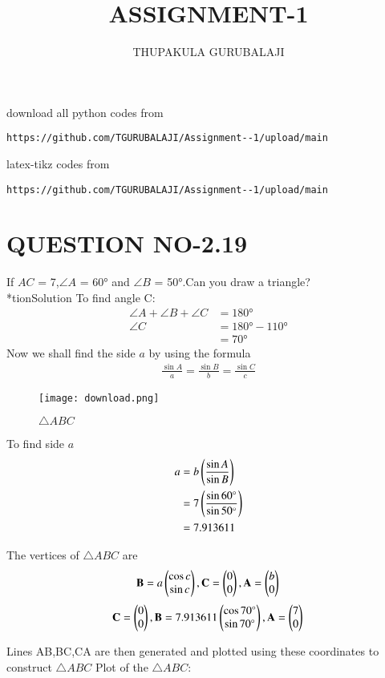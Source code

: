 \documentclass[journal,12pt,twocolumn]{IEEEtran}
\begin{document}
     \def\rightbox#1{\makebox[0in][r]{#1}}
     \def\centbox#1{\makebox[0in]{#1}}
     \def\topbox#1{\raisebox{-\baselineskip}[0in][0in]{#1}}
     \def\midbox#1{\raisebox{-0.5\baselineskip}[0in][0in]{#1}}
\vspace{3cm}
\title{ASSIGNMENT-1}
\author{THUPAKULA GURUBALAJI}
\maketitle
\newpage
\bigskip
\renewcommand{\thefigure}{\theenumi}
\renewcommand{\thetable}{\theenumi}
%
download all python codes from 
%
\begin{lstlisting}
https://github.com/TGURUBALAJI/Assignment--1/upload/main
\end{lstlisting}
%
latex-tikz codes from
%
\begin{lstlisting}
https://github.com/TGURUBALAJI/Assignment--1/upload/main
\end{lstlisting}
%
\section{QUESTION NO-2.19}
 \noindent If  $AC$ = 7,$\angle{A}$ = \ang{60} and $\angle{B}$ = \ang{50}.Can you draw a triangle?
%
\
\\*tion{Solution}
To find angle C:
\begin{align}
\angle{A} + \angle{B} + \angle{C} &= \ang{180}
\\
\angle{C} &= \ang{180} - \ang{110}
\\
&= \ang{70}
\end{align}
Now we shall find the side $a$ by using the formula
\begin{align}
\frac{\sin{A}}{a} = \frac{\sin{B}}{b} = \frac{\sin{C}}{c}
\end{align}

\begin{figure}[!h]
\texttt{[image: download.png]}
\caption{$\triangle ABC$}
\label{fig:triangle}	
\end{figure}
To find side $a$
\begin{align}
a&= b\left(\frac{\sin{A}}{\sin{B}}\right) 
\\
&= 7 \left(\frac{\sin{\ang{60}}}{\sin{\ang{50}}}\right)
\\
&= 7.913611
\end{align}

The vertices of $\triangle ABC$ are
\begin{equation}
\mathbf{B} =a \begin{pmatrix}\cos c\\ \sin c\end{pmatrix}, \mathbf{C} = \begin{pmatrix} 0\\ 0\end{pmatrix} ,\mathbf{A} =\begin{pmatrix}b \\ 0\end{pmatrix} \\
\\
\end{equation}
\begin{equation}
\mathbf{C} =\begin{pmatrix}0 \\ 0\end{pmatrix},\mathbf{B} =7.913611\begin{pmatrix}\cos{\ang{70}} \\ \sin{\ang{70}}\end{pmatrix},\mathbf{A} =\begin{pmatrix}7 \\ 0\end{pmatrix}\\
\end{equation}

Lines AB,BC,CA are then generated and plotted using these coordinates to construct $\triangle ABC$
Plot of the $\triangle ABC$:
\end{document}
